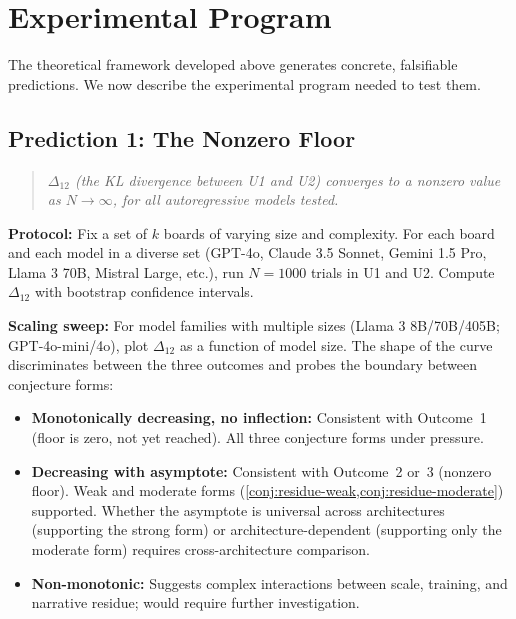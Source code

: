 \documentclass[12pt,a4paper]{article}
\theoremstyle{definition}
\theoremstyle{remark}
\begin{document}
\section{Experimental Program}
\label{sec:experimental}

The theoretical framework developed above generates concrete,
falsifiable predictions.  We now describe the experimental program
needed to test them.

\subsection{Prediction 1: The Nonzero Floor}
\label{sec:pred1}

\begin{quote}
  \textit{$\Delta_{12}$ (the KL divergence between U1 and U2)
  converges to a nonzero value as $N \to \infty$, for all
  autoregressive models tested.}
\end{quote}

\textbf{Protocol:}  Fix a set of $k$ boards of varying size and
complexity.  For each board and each model in a diverse set
(GPT-4o, Claude 3.5 Sonnet, Gemini 1.5 Pro, Llama 3 70B, Mistral
Large, etc.), run $N = 1000$ trials in U1 and U2.  Compute
$\Delta_{12}$ with bootstrap confidence intervals.

\textbf{Scaling sweep:}  For model families with multiple sizes
(Llama 3 8B/70B/405B; GPT-4o-mini/4o), plot $\Delta_{12}$ as a
function of model size.  The shape of the curve discriminates
between the three outcomes and probes the boundary between
conjecture forms:
\begin{itemize}
  \item \textbf{Monotonically decreasing, no inflection:}
    Consistent with Outcome~1 (floor is zero, not yet reached).
    All three conjecture forms under pressure.
  \item \textbf{Decreasing with asymptote:}
    Consistent with Outcome~2 or~3 (nonzero floor).  Weak and
    moderate forms (\cref{conj:residue-weak,conj:residue-moderate})
    supported.  Whether the asymptote is universal across
    architectures (supporting the strong form) or
    architecture-dependent (supporting only the moderate form)
    requires cross-architecture comparison.
  \item \textbf{Non-monotonic:}
    Suggests complex interactions between scale, training, and
    narrative residue; would require further investigation.
\end{itemize}
\end{document}
